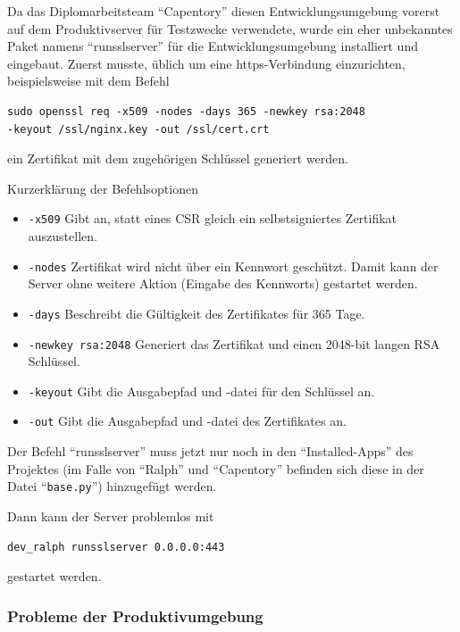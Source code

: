 Da das Diplomarbeitsteam ``Capentory'' diesen Entwicklungsumgebung
vorerst auf dem Produktivserver für Testzwecke verwendete, wurde ein
eher unbekanntes Paket namens ``runsslserver'' für die
Entwicklungsumgebung installiert und eingebaut. Zuerst musste, üblich um
eine https-Verbindung einzurichten, beispielsweise mit dem Befehl

\begin{verbatim}
sudo openssl req -x509 -nodes -days 365 -newkey rsa:2048 
-keyout /ssl/nginx.key -out /ssl/cert.crt
\end{verbatim}

ein Zertifikat mit dem zugehörigen Schlüssel generiert werden.

Kurzerklärung der Befehlsoptionen

\begin{itemize}
\tightlist
\item
  \texttt{-x509} Gibt an, statt eines CSR gleich ein selbstsigniertes
  Zertifikat auszustellen.
\item
  \texttt{-nodes} Zertifikat wird nicht über ein Kennwort geschützt.
  Damit kann der Server ohne weitere Aktion (Eingabe des Kennworts)
  gestartet werden.
\item
  \texttt{-days} Beschreibt die Gültigkeit des Zertifikates für 365
  Tage.
\item
  \texttt{-newkey\ rsa:2048} Generiert das Zertifikat und einen 2048-bit
  langen RSA Schlüssel.
\item
  \texttt{-keyout} Gibt die Ausgabepfad und -datei für den Schlüssel an.
\item
  \texttt{-out} Gibt die Ausgabepfad und -datei des Zertifikates an.
\end{itemize}

Der Befehl ``runsslserver'' muss jetzt nur noch in den
``Installed-Apps'' des Projektes (im Falle von ``Ralph'' und
``Capentory'' befinden sich diese in der Datei ``\texttt{base.py}'')
hinzugefügt werden.

Dann kann der Server problemlos mit

\begin{verbatim}
dev_ralph runsslserver 0.0.0.0:443
\end{verbatim}

gestartet werden.

\hypertarget{probleme-der-produktivumgebung}{%
\subsubsection{Probleme der
Produktivumgebung}\label{probleme-der-produktivumgebung}}

